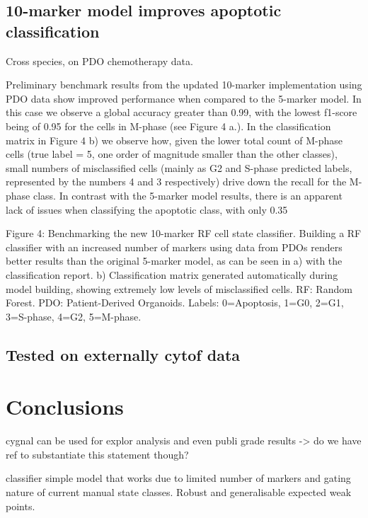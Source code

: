 \subsection{10-marker model improves apoptotic classification}

Cross species, on PDO chemotherapy data.

Preliminary benchmark results from the updated 10-marker implementation using PDO data show improved performance when compared to the 5-marker model. In this case we observe a global accuracy greater than 0.99, with the lowest f1-score being of 0.95 for the cells in M-phase (see Figure 4 a.). In the classification matrix in Figure 4 b) we observe how, given the lower total count of M-phase cells (true label = 5, one order of magnitude smaller than the other classes), small numbers of misclassified cells (mainly as G2 and S-phase predicted labels, represented by the numbers 4 and 3 respectively) drive down the recall for the M-phase class. 
In contrast with the 5-marker model results, there is an apparent lack of issues when classifying the apoptotic class, with only 0.35%
 
Figure 4: Benchmarking the new 10-marker RF cell state classifier. Building a RF classifier with an increased number of markers using data from PDOs renders better results than the original 5-marker model, as can be seen in a) with the classification report. b) Classification matrix generated automatically during model building, showing extremely low levels of misclassified cells. RF: Random Forest. PDO: Patient-Derived Organoids. Labels: 0=Apoptosis, 1=G0, 2=G1, 3=S-phase, 4=G2, 5=M-phase.

\subsection{Tested on externally cytof data}



\section{Conclusions}

cygnal can be used for explor analysis and even publi grade results -> do we have ref to substantiate this statement though?

classifier simple model that works due to limited number of markers and gating nature of current manual state classes. Robust and generalisable expected weak points.